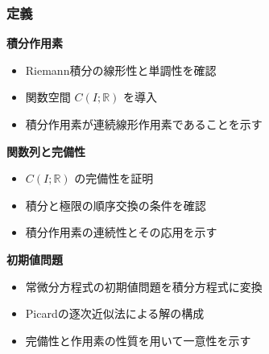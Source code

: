 \documentclass[aspectratio=169]{beamer}
\newenvironment{sectionblock}[1]{%
  \begin{minipage}{\textwidth}%
    \textbf{\large #1}\par\vspace{0.5em}%
}{%
  \end{minipage}\vspace{1em}%
}
\newcommand{\sectioncontent}[2]{%
  \begin{sectionblock}{#1}%
    \begin{itemize}%
      #2%
    \end{itemize}%
  \end{sectionblock}%
}
\begin{document}
\begin{frame}
\frametitle{定義}

\sectioncontent{積分作用素}{
  \item Riemann積分の線形性と単調性を確認
  \item 関数空間 $C(I; \mathbb{R})$ を導入
  \item 積分作用素が連続線形作用素であることを示す
}

\sectioncontent{関数列と完備性}{
  \item $C(I; \mathbb{R})$ の完備性を証明
  \item 積分と極限の順序交換の条件を確認
  \item 積分作用素の連続性とその応用を示す
}

\sectioncontent{初期値問題}{
  \item 常微分方程式の初期値問題を積分方程式に変換
  \item Picardの逐次近似法による解の構成
  \item 完備性と作用素の性質を用いて一意性を示す
}

\end{frame}
\end{document}

